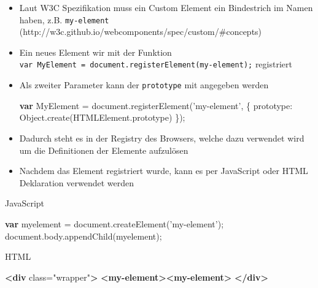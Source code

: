 \documentclass[11pt,a4paper]{report}
\newenvironment{Shaded}{}{}
\newcommand{\KeywordTok}[1]{\textcolor[rgb]{0.00,0.44,0.13}{\textbf{{#1}}}}
\newcommand{\DataTypeTok}[1]{\textcolor[rgb]{0.56,0.13,0.00}{{#1}}}
\newcommand{\StringTok}[1]{\textcolor[rgb]{0.25,0.44,0.63}{{#1}}}
\newcommand{\OtherTok}[1]{\textcolor[rgb]{0.00,0.44,0.13}{{#1}}}
\newcommand{\VariableTok}[1]{\textcolor[rgb]{0.10,0.09,0.49}{{#1}}}
\newcommand{\OperatorTok}[1]{\textcolor[rgb]{0.40,0.40,0.40}{{#1}}}
\newcommand{\AttributeTok}[1]{\textcolor[rgb]{0.49,0.56,0.16}{{#1}}}
\newcommand{\NormalTok}[1]{{#1}}
\begin{document}
\begin{itemize}
\item
  Laut W3C Spezifikation muss ein Custom Element ein Bindestrich im
  Namen haben, z.B. \texttt{my-element}
  (http://w3c.github.io/webcomponents/spec/custom/\#concepts)
\item
  Ein neues Element wir mit der Funktion
  \texttt{var\ MyElement\ =\ document.registerElement(\textquotesingle{}my-element\textquotesingle{});}
  registriert
\item
  Als zweiter Parameter kann der \texttt{prototype} mit angegeben werden

\begin{Shaded}
\begin{Highlighting}[]
\KeywordTok{var} \NormalTok{MyElement }\OperatorTok{=} \VariableTok{document}\NormalTok{.}\AttributeTok{registerElement}\NormalTok{(}\StringTok{'my-element'}\OperatorTok{,} \OperatorTok{\{}
  \DataTypeTok{prototype}\OperatorTok{:} \VariableTok{Object}\NormalTok{.}\AttributeTok{create}\NormalTok{(}\VariableTok{HTMLElement}\NormalTok{.}\AttributeTok{prototype}\NormalTok{)}
\OperatorTok{\}}\NormalTok{)}\OperatorTok{;}
\end{Highlighting}
\end{Shaded}
\item
  Dadurch steht es in der Registry des Browsers, welche dazu verwendet
  wird um die Definitionen der Elemente aufzulösen
\item
  Nachdem das Element registriert wurde, kann es per JavaScript oder
  HTML Deklaration verwendet werden
\end{itemize}

JavaScript

\begin{Shaded}
\begin{Highlighting}[]
\KeywordTok{var} \NormalTok{myelement }\OperatorTok{=} \VariableTok{document}\NormalTok{.}\AttributeTok{createElement}\NormalTok{(}\StringTok{'my-element'}\NormalTok{)}\OperatorTok{;}
\VariableTok{document}\NormalTok{.}\VariableTok{body}\NormalTok{.}\AttributeTok{appendChild}\NormalTok{(myelement)}\OperatorTok{;}
\end{Highlighting}
\end{Shaded}

HTML

\begin{Shaded}
\begin{Highlighting}[]
\KeywordTok{<div}\OtherTok{ class=}\StringTok{"wrapper"}\KeywordTok{>}
  \KeywordTok{<my-element><my-element>}
\KeywordTok{</div>}
\end{Highlighting}
\end{Shaded}
\end{document}
